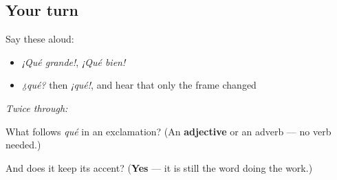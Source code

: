 \subsection*{Your turn}
Say these aloud:

\begin{itemize}
\raggedright
  \item \emph{¡Qué grande!}, \emph{¡Qué bien!}
  \item \emph{¿qué?} then \emph{¡qué!}, and hear that only the frame changed
\end{itemize}

\emph{Twice through:}

\begin{tcolorbox}[breakable,colback=teal!4,colframe=teal!35!black,title={Before you move on}]
What follows \emph{qué} in an exclamation? (An \textbf{adjective} or an adverb — no verb needed.)

And does it keep its accent? (\textbf{Yes} — it is still the word doing the work.)
\end{tcolorbox}
